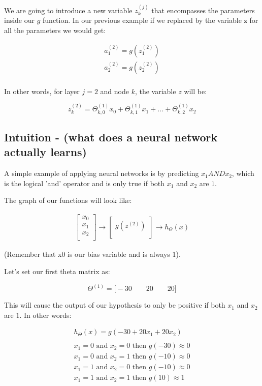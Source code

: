 We are going to introduce a new variable $z_k^{(j)}$ that encompasses the parameters inside our $g$ function. In our previous example if we replaced by the variable z for all the parameters we would get:

\begin{align*}
	a^{(2)}_1 = g(z^{(2)}_1) \\
	a^{(2)}_2 = g(z^{(2)}_2) \\
\end{align*}

\noindent In other words, for layer $j=2$ and node $k$, the variable $z$ will be:

$$z^{(2)}_k = \Theta^{(1)}_{k,0}x_0 + \Theta^{(1)}_{k,1}x_1 + \hdots + \Theta^{(1)}_{k,2}x_2$$


\subsection{Intuition - (what does a neural network actually learns)}
A simple example of applying neural networks is by predicting $x_1 AND x_2$, which is the logical 'and' operator and is only true if both $x_1$ and $x_2$ are $1$.

\noindent The graph of our functions will look like:

\begin{align}
	\begin{bmatrix}
		x_0 \\
		x_1 \\
		x_2 \\
	\end{bmatrix}
	\rightarrow
	\begin{bmatrix}
		g(z^{(2)}) \\
	\end{bmatrix}
	\rightarrow
	h_{\Theta}(x) \label{neural-network-rep}
\end{align}

\noindent (Remember that x0 is our bias variable and is always 1).

\noindent Let's set our first theta matrix as:

$$\Theta^{(1)} = \Big[ -30 \qquad 20 \qquad 20\Big]$$

This will cause the output of our hypothesis to only be positive if both $x_1$ and $x_2$ are $1$. In other words:

\begin{align*}
	h_{\Theta}(x) = g(-30 + 20x_1 + 20x_2) \\
	\\
	x_1 = 0 \text{ and } x_2 = 0 \text{ then } g(-30) \approx 0 \\
	x_1 = 0 \text{ and } x_2 = 1 \text{ then } g(-10) \approx 0 \\
	x_1 = 1 \text{ and } x_2 = 0 \text{ then } g(-10) \approx 0 \\
	x_1 = 1 \text{ and } x_2 = 1 \text{ then } g(10) \approx 1 \\
\end{align*}

